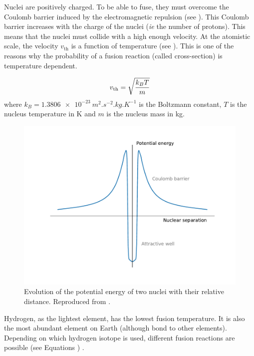 Nuclei are positively charged.
To be able to fuse, they must overcome the Coulomb barrier induced by the electromagnetic repulsion (see ).
This Coulomb barrier increases with the charge of the nuclei (\textit{ie} the number of protons).
This means that the nuclei must collide with a high enough velocity.
At the atomistic scale, the velocity $v_\mathrm{th}$ is a function of temperature (see ).
This is one of the reasons why the probability of a fusion reaction (called cross-section) is temperature dependent.

\begin{equation}
    v_\mathrm{th} = \sqrt{\frac{k_B T}{m}}
    \labeq{thermal velocity}
\end{equation}
where $k_B = \SI{1.3806e-23}{m^2.s^{-2}.kg.K^{-1}}$ is the Boltzmann constant, $T$ is the nucleus temperature in \si{K} and $m$ is the nucleus mass in \si{kg}.


\begin{figure} [h]
    \centering
    \includegraphics[width=\linewidth]{Figures/Chapter1/potential_energy.pdf}
    \caption{Evolution of the potential energy of two nuclei with their relative distance. Reproduced from \cite{mccracken_fusion_2013}.}
\end{figure}

Hydrogen, as the lightest element, has the lowest fusion temperature.
It is also the most abundant element on Earth (although bond to other elements).
Depending on which hydrogen isotope is used, different fusion reactions are possible (see Equations ) \cite{forrest_fendl-3_2012}.

